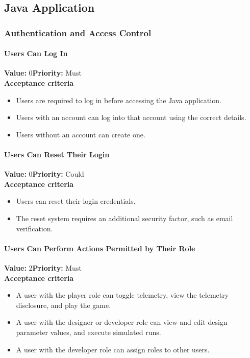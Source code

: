 \subsection{Java Application}

\subsubsection{Authentication and Access Control}

\paragraph{Users Can Log In}
\textbf{Value:} 0\quad \textbf{Priority:} Must\\
\textbf{Acceptance criteria}
\begin{itemize}
  \item Users are required to log in before accessing the Java application.
  \item Users with an account can log into that account using the correct details.
  \item Users without an account can create one.
\end{itemize}

\paragraph{Users Can Reset Their Login}
\textbf{Value:} 0\quad \textbf{Priority:} Could\\
\textbf{Acceptance criteria}
\begin{itemize}
  \item Users can reset their login credentials.
  \item The reset system requires an additional security factor, such as email verification.
\end{itemize}

\paragraph{Users Can Perform Actions Permitted by Their Role}
\textbf{Value:} 2\quad \textbf{Priority:} Must\\
\textbf{Acceptance criteria}
\begin{itemize}
  \item A user with the player role can toggle telemetry, view the telemetry disclosure, and play the game.
  \item A user with the designer or developer role can view and edit design parameter values, and execute simulated runs.
  \item A user with the developer role can assign roles to other users.
\end{itemize}

